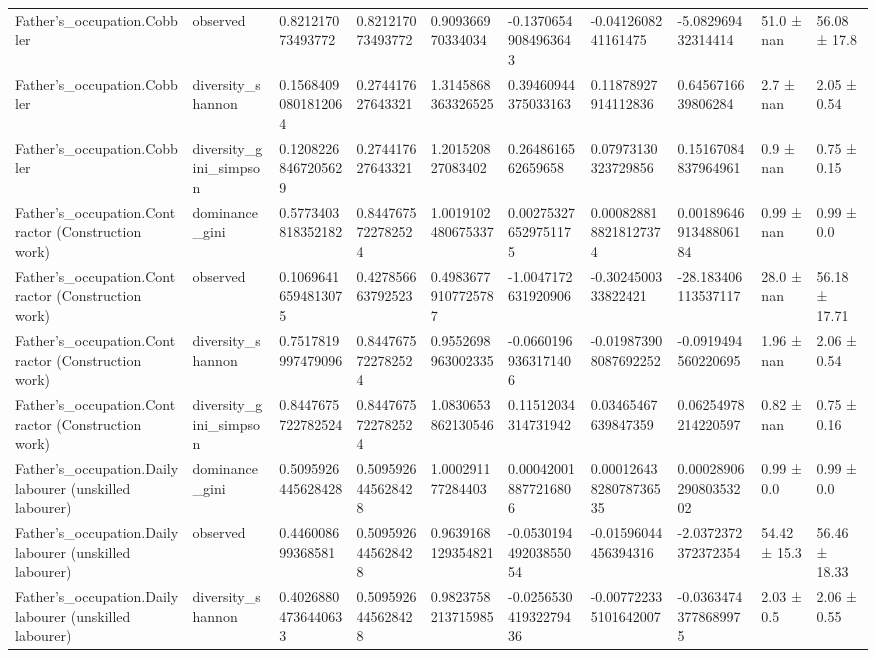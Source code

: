 \begin{longtable}{llllllllll}
Father’s\_occupation.Cobbler & observed & 0.821217073493772 & 0.821217073493772 & 0.909366970334034 & -0.13706549084963643 & -0.0412608241161475 & -5.082969432314414 & 51.0 ± nan & 56.08 ± 17.8 \\
Father’s\_occupation.Cobbler & diversity\_shannon & 0.15684090801812064 & 0.274417627643321 & 1.3145868363326525 & 0.39460944375033163 & 0.11878927914112836 & 0.6456716639806284 & 2.7 ± nan & 2.05 ± 0.54 \\
Father’s\_occupation.Cobbler & diversity\_gini\_simpson & 0.12082268467205629 & 0.274417627643321 & 1.201520827083402 & 0.2648616562659658 & 0.07973130323729856 & 0.15167084837964961 & 0.9 ± nan & 0.75 ± 0.15 \\
Father’s\_occupation.Contractor (Construction work) & dominance\_gini & 0.5773403818352182 & 0.8447675722782524 & 1.0019102480675337 & 0.002753276529751175 & 0.0008288188218127374 & 0.0018964691348806184 & 0.99 ± nan & 0.99 ± 0.0 \\
Father’s\_occupation.Contractor (Construction work) & observed & 0.10696416594813075 & 0.427856663792523 & 0.49836779107725787 & -1.0047172631920906 & -0.3024500333822421 & -28.183406113537117 & 28.0 ± nan & 56.18 ± 17.71 \\
Father’s\_occupation.Contractor (Construction work) & diversity\_shannon & 0.7517819997479096 & 0.8447675722782524 & 0.9552698963002335 & -0.06601969363171406 & -0.019873908087692252 & -0.0919494560220695 & 1.96 ± nan & 2.06 ± 0.54 \\
Father’s\_occupation.Contractor (Construction work) & diversity\_gini\_simpson & 0.8447675722782524 & 0.8447675722782524 & 1.0830653862130546 & 0.11512034314731942 & 0.03465467639847359 & 0.06254978214220597 & 0.82 ± nan & 0.75 ± 0.16 \\
Father’s\_occupation.Daily labourer (unskilled labourer) & dominance\_gini & 0.5095926445628428 & 0.5095926445628428 & 1.000291177284403 & 0.000420018877216806 & 0.00012643828078736535 & 0.0002890629080353202 & 0.99 ± 0.0 & 0.99 ± 0.0 \\
Father’s\_occupation.Daily labourer (unskilled labourer) & observed & 0.446008699368581 & 0.5095926445628428 & 0.9639168129354821 & -0.053019449203855054 & -0.01596044456394316 & -2.0372372372372354 & 54.42 ± 15.3 & 56.46 ± 18.33 \\
Father’s\_occupation.Daily labourer (unskilled labourer) & diversity\_shannon & 0.40268804736440633 & 0.5095926445628428 & 0.9823758213715985 & -0.025653041932279436 & -0.007722335101642007 & -0.03634743778689975 & 2.03 ± 0.5 & 2.06 ± 0.55 \\

\end{longtable}
